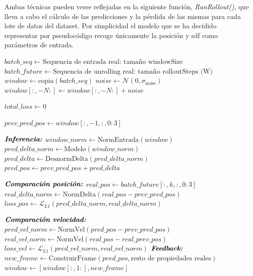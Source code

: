 Ambas técnicas pueden verse reflejadas en la siguiente función, \textit{RunRollout()}, que lleva a cabo el cálculo de las predicciones y la pérdida de las mismas para cada lote de datos del dataset. Por simplicidad el modelo que se ha decidido representar por pseudocódigo recoge únicamente la posición y sdf como parámetros de entrada.

\begin{algorithm}[H]
\caption{Función de \textit{Unrolling} sobre RNN}
\label{alg:run_rollout}
\begin{algorithmic}
    \State $ batch\_seq \gets \text{Sequencia de entrada real: tamaño windowSize}$
    \State $ batch\_future \gets \text{Sequencia de unrolling real: tamaño rolloutSteps (W)}$
    \BlankLine
    \State $window \gets \text{copia}(batch\_seq)$ 
    \BlankLine
    \State $noise \gets \mathcal{N}(0, \sigma_{\text{noise}})$
    \State $window[:, -N:] \gets window[:, -N:] + noise$ 
    
    \BlankLine
    \State $total\_loss \gets 0$
    \Statex {} {
        \State $ prev\_pred\_pos \gets window[:, -1, :, 0:3]$ 

    \BlankLine
    \State $\textbf{\textit{Inferencia:}}$
        \State $window\_norm \gets \text{NormEntrada}(window)$
        \State $ pred\_delta\_norm \gets \text{Modelo}(window\_norm)$         
        \State $ pred\_delta \gets \text{DesnormDelta}(pred\_delta\_norm)$ 
        \State $ pred\_pos \gets prev\_pred\_pos + pred\_delta$ 

    \BlankLine
    \State $\textbf{\textit{Comparación posición:}}$
        \State $real\_pos \gets batch\_future[:, k, :, 0:3]$ 
        \State $real\_delta\_norm \gets \text{NormDelta}(real\_pos - prev\_pred\_pos)$ 
        \State $loss\_pos \gets \mathcal{L}_{L1}(pred\_delta\_norm, real\_delta\_norm)$ 
        
    \BlankLine
    \State $\textbf{\textit{Comparación velocidad:}}$
        \State $pred\_vel\_norm \gets \text{NormVel}(pred\_pos - prev\_pred\_pos)$
        \State {}
        \State $real\_vel\_norm \gets \text{NormVel}(real\_pos - real\_prev\_pos)$   
        \State $loss\_vel \gets \mathcal{L}_{L1}(pred\_vel\_norm, real\_vel\_norm)$  
    \BlankLine
    \State $\textbf{\textit{Feedback:}}$
        \State $new\_frame \gets \text{ConstruirFrame}(pred\_pos, \text{resto de propiedades reales})$
        \State $window \gets [window[:, 1:], new\_frame]$ 
    
}
\end{algorithmic}
\end{algorithm}
